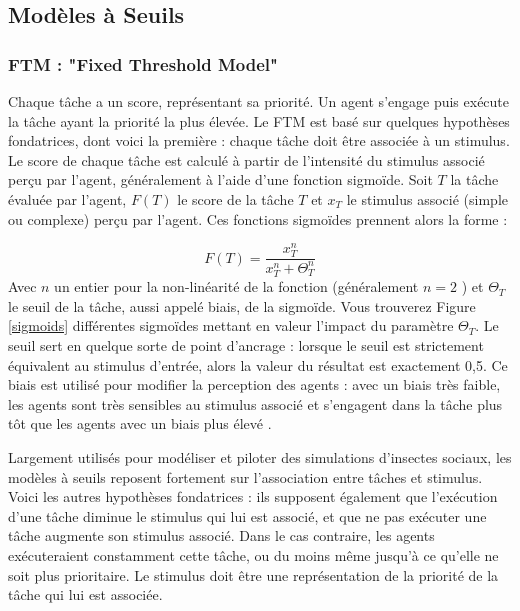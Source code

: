         
		\subsection{Modèles à Seuils}
		\label{subsectionRTM}
		\subsubsection{FTM : "Fixed Threshold Model" \cite{bonabeau_natural_1999}}
        Chaque tâche a un score, représentant sa priorité. Un agent s'engage puis exécute la tâche ayant la priorité la plus élevée. Le FTM est basé sur quelques hypothèses fondatrices, dont voici la première : chaque tâche doit être associée à un stimulus. Le score de chaque tâche est calculé à partir de l'intensité du stimulus associé perçu par l'agent, généralement à l'aide d'une fonction sigmoïde. Soit $T$ la tâche évaluée par l'agent, $F(T)$ le score de la tâche $T$ et $x_T$ le stimulus associé (simple ou complexe) perçu par l'agent. Ces fonctions sigmoïdes prennent alors la forme :
			
\begin{equation}
\label{equationSigmoid}
	F(T) = \frac{x_T^n}{x_T^n + \Theta_T^n}
\end{equation}	
 Avec $n$ un entier pour la non-linéarité de la fonction (généralement $n=2$ \cite{schmickl_taskselsim_2008}) et $\Theta_T$ le seuil de la tâche, aussi appelé biais, de la sigmoïde. Vous trouverez Figure \ref{sigmoids} différentes sigmoïdes mettant en valeur l'impact du paramètre $\Theta_T$. Le seuil sert en quelque sorte de point d'ancrage : lorsque le seuil est strictement équivalent au stimulus d'entrée, alors la valeur du résultat est exactement 0,5. Ce biais est utilisé pour modifier la perception des agents : avec un biais très faible, les agents sont très sensibles au stimulus associé et s'engagent dans la tâche plus tôt que les agents avec un biais plus élevé \cite{dornhaus_task_nodate}. 
        
        Largement utilisés pour modéliser et piloter des simulations d'insectes sociaux, les modèles à seuils reposent fortement sur l'association entre tâches et stimulus. Voici les autres hypothèses fondatrices : ils supposent également que l'exécution d'une tâche diminue le stimulus qui lui est associé, et que ne pas exécuter une tâche augmente son stimulus associé. Dans le cas contraire, les agents exécuteraient constamment cette tâche, ou du moins même jusqu'à ce qu'elle ne soit plus prioritaire. Le stimulus doit être une représentation de la priorité de la tâche qui lui est associée. 
        
